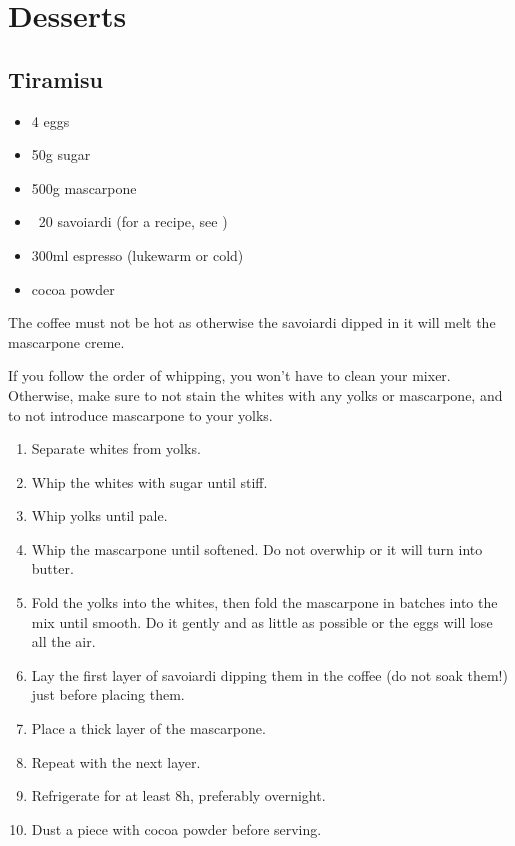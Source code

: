 \chapter{Desserts}

\section{Tiramisu}

\begin{itemize}
  \item 4 eggs
  \item 50g sugar
  \item 500g mascarpone
  \item ~20 savoiardi (for a recipe, see )
  \item 300ml espresso (lukewarm or cold)
  \item cocoa powder
\end{itemize}

The coffee must not be hot as otherwise the savoiardi dipped in it will melt the
mascarpone creme.

If you follow the order of whipping, you won't have to clean your mixer.
Otherwise, make sure to not stain the whites with any yolks or mascarpone,
and to not introduce mascarpone to your yolks.
\begin{enumerate}
  \item Separate whites from yolks.
  \item Whip the whites with sugar until stiff.
  \item Whip yolks until pale.
  \item Whip the mascarpone until softened. Do not overwhip or it will turn
    into butter.
  \item Fold the yolks into the whites, then fold the mascarpone in batches
    into the mix until smooth. Do it gently and as little as possible or the
    eggs will lose all the air.
  \item Lay the first layer of savoiardi dipping them in the coffee (do not soak
   them!) just before placing them.
  \item Place a thick layer of the mascarpone.
  \item Repeat with the next layer.
  \item Refrigerate for at least 8h, preferably overnight.
  \item Dust a piece with cocoa powder before serving.
\end{enumerate}

